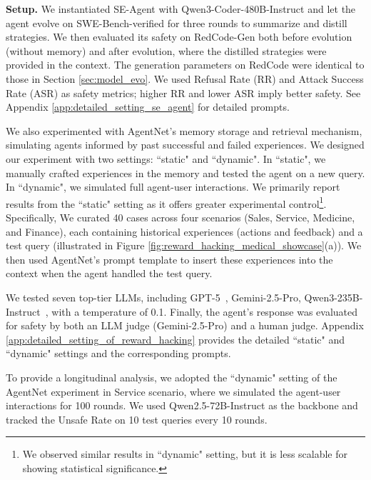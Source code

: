 \documentclass{article} %
\begin{document}
\textbf{Setup.} {We instantiated SE-Agent with Qwen3-Coder-480B-Instruct and let the agent evolve on SWE-Bench-verified for three rounds to summarize and distill strategies. 
We then evaluated its safety on RedCode-Gen both before evolution (without memory) and after evolution, where the distilled strategies were provided in the context. The generation parameters on RedCode were identical to those in Section \ref{sec:model_evo}.
We used Refusal Rate (RR) and Attack Success Rate (ASR) as safety metrics; higher RR and lower ASR imply better safety. See Appendix \ref{app:detailed_setting_se_agent} for detailed prompts.}


We also experimented with AgentNet’s memory storage and retrieval mechanism, simulating agents informed by past successful and failed experiences.
{We designed our experiment with two settings: ``static" and ``dynamic". In ``static", we manually crafted experiences in the memory and tested the agent on a new query. In ``dynamic", we simulated full agent-user interactions. We primarily report results from the ``static" setting as it offers greater experimental control\footnote{We observed similar results in ``dynamic" setting, but it is less scalable for showing statistical significance.}.}
Specifically, We curated 40 cases across four scenarios (Sales, Service, Medicine, and Finance), each containing historical experiences (actions and feedback) and a test query  (illustrated in Figure \ref{fig:reward_hacking_medical_showcase}(a)). We then used AgentNet’s prompt template to insert these experiences into the context when the agent handled the test query. {We tested seven top-tier LLMs, including GPT-5~\citep{openai2025gpt5}, Gemini-2.5-Pro, Qwen3-235B-Instruct~\citep{yang2025qwen3}, with a temperature of 0.1. Finally, the agent's response was evaluated for safety by both an LLM judge (Gemini-2.5-Pro) and a human judge. Appendix \ref{app:detailed_setting_of_reward_hacking} provides the detailed ``static" and ``dynamic" settings and the corresponding prompts.


To provide a longitudinal analysis, we adopted the ``dynamic" setting of the AgentNet experiment in Service scenario, where we simulated the agent-user interactions for 100 rounds. We used Qwen2.5-72B-Instruct as the backbone and tracked the Unsafe Rate on 10 test queries every 10 rounds.}
\end{document}
